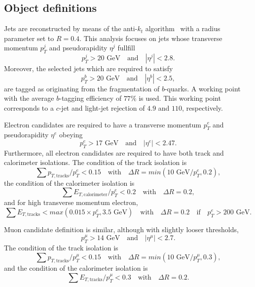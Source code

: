 \documentclass{ws-mpla}
\begin{document}
\subsection{Object definitions}

Jets are reconstructed by means of the anti-$k_t$ algorithm~\cite{Cacciari:2008gp} with a radius parameter set to $R=0.4$. This analysis focuses on jets whose transverse momentum $p^j_T$ and pseudorapidity $\eta^j$ fullfill
\begin{equation}
p^j_T > 20\textrm{ GeV}\quad \textrm{and}\quad |\eta^j| < 2.8.
\end{equation} 
Moreover, {\color{blue}the selected jets which are required to satisfy 
\begin{equation}
p^b_T > 20 \textrm{ GeV}\quad \textrm{and}\quad |\eta^b| < 2.5,
\end{equation}
are tagged as originating from the fragmentation of $b$-quarks.}
A working point with the average $b$-tagging efficiency of $77\%$ is used. This working point corresponds to a $c$-jet and light-jet rejection of $4.9$ and $110$, respectively.

Electron candidates are required to have a transverse momentum $p^e_T$ and pseudorapidity $\eta^e$ obeying
\begin{equation}
p^e_T > 17 \textrm{ GeV}\quad \textrm{and}\quad |\eta^e| < 2.47.
\end{equation}
Furthermore, all electron candidates are required to have both track and calorimeter isolations. The condition of the track isolation is
\begin{equation}
\sum p_{T,\textrm{tracks}}/p^e_T < 0.15\quad \textrm{with}\quad \Delta R=min(10\textrm{ GeV}/p^e_T,0.2),
\end{equation}
the condition of the calorimeter isolation is
\begin{equation}
\sum E_{T,\textrm{calorimeter}}/p^e_T < 0.2\quad \textrm{with}\quad \Delta R=0.2,
\end{equation}
and for high transverse momentum electron, 
\begin{equation}
\sum E_{T,\textrm{tracks}} < max(0.015\times p^e_T,3.5\textrm{ GeV})\quad \textrm{with}\quad \Delta R=0.2\quad \textrm{if}\quad p^e_T > 200\textrm{ GeV}.
\end{equation}

Muon candidate definition is similar, although with slightly looser thresholds,
\begin{equation}
p^{\mu}_T > 14 \textrm{ GeV}\quad \textrm{and}\quad |\eta^{\mu}| < 2.7.
\end{equation}
The condition of the track isolation is 
\begin{equation}
\sum p_{T,\textrm{tracks}}/p^{\mu}_T < 0.15\quad \textrm{with}\quad \Delta R=min(10\textrm{ GeV}/p^{\mu}_T,0.3),
\end{equation}
and the condition of the calorimeter isolation is
\begin{equation}
\sum E_{T,\textrm{tracks}}/p^{\mu}_T < 0.3\quad \textrm{with}\quad \Delta R=0.2.
\end{equation}
\end{document}
